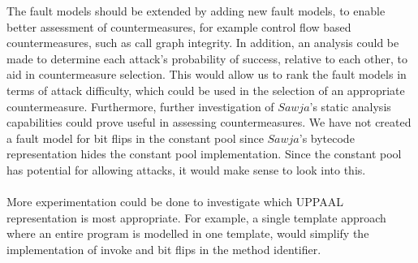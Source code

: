 The fault models should be extended by adding new fault models, to enable better assessment of countermeasures, for example control flow based countermeasures, such as call graph integrity. In addition, an analysis could be made to determine each attack's probability of success, relative to each other, to aid in countermeasure selection. This would allow us to rank the fault models in terms of attack difficulty, which could be used in the selection of an appropriate countermeasure. Furthermore, further investigation of $Sawja$'s static analysis capabilities could prove useful in assessing countermeasures. We have not created a fault model for bit flips in the constant pool since $Sawja$'s bytecode representation hides the constant pool implementation. Since the constant pool has potential for allowing attacks, it would make sense to look into this.\\\\
More experimentation could be done to investigate which UPPAAL representation is most appropriate. For example, a single template approach where an entire program is modelled in one template, would simplify  the implementation of invoke and bit flips in the method identifier.
